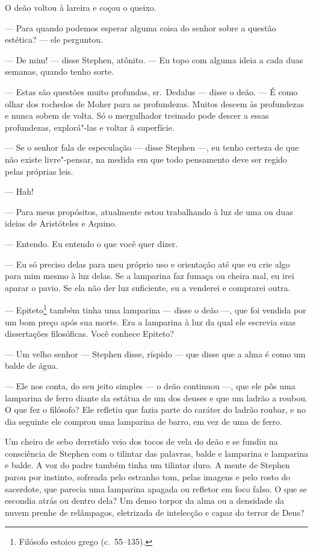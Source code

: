 O deão voltou à lareira e coçou o queixo.

 --- Para quando podemos esperar alguma coisa do senhor sobre a questão
estética? --- ele perguntou.

 --- De mim! --- disse Stephen, atônito. --- Eu topo com alguma ideia a cada duas
semanas, quando tenho sorte.

 --- Estas são questões muito profundas, sr.~Dedalus --- disse o deão. --- É como
olhar dos rochedos de Moher para as profundezas. Muitos descem às
profundezas e nunca sobem de volta. Só o mergulhador treinado pode
descer a essas profundezas, explorá"-las e voltar à superfície.

 --- Se o senhor fala de especulação --- disse Stephen ---, eu tenho certeza de
que não existe livre"-pensar, na medida em que todo pensamento deve ser
regido pelas próprias leis.

 --- Hah!

 --- Para meus propósitos, atualmente estou trabalhando à luz de uma ou
duas ideias de Aristóteles e Aquino.

 --- Entendo. Eu entendo o que você quer dizer.

 --- Eu só preciso delas para meu próprio uso e orientação até que eu crie
algo para mim mesmo à luz delas. Se a lamparina faz fumaça ou cheira mal,
eu irei aparar o pavio. Se ela não der luz suficiente, eu a venderei e
comprarei outra.

--- Epiteto\footnote{ Filósofo estoico grego (c.~55--135).} também tinha uma lamparina 
--- disse o deão ---, que foi vendida por
um bom preço após sua morte. Era a lamparina à luz da qual ele escrevia
suas dissertações filosóficas. Você conhece Epiteto?

 --- Um velho senhor --- Stephen disse, ríspido --- que disse que a alma é como
um balde de água.

 --- Ele nos conta, do seu jeito simples --- o deão continuou ---, que ele pôs uma
lamparina de ferro diante da estátua de um dos deuses e que um ladrão
a roubou. O que fez o filósofo? Ele refletiu que fazia parte do
caráter do ladrão roubar, e no dia seguinte ele comprou uma lamparina de
barro, em vez de uma de ferro.

Um cheiro de sebo derretido veio dos tocos de vela do deão e se fundiu
na consciência de Stephen com o tilintar das palavras, balde e lamparina
e lamparina e balde. A voz do padre também tinha um tilintar duro. A
mente de Stephen parou por instinto, sofreada pelo estranho tom, pelas
imagens e pelo rosto do sacerdote, que parecia uma lamparina apagada ou
refletor em foco falso. O que se escondia atrás ou dentro dela? Um
denso torpor da alma ou a densidade da nuvem prenhe de relâmpagos,
eletrizada de intelecção e capaz do terror de Deus?

